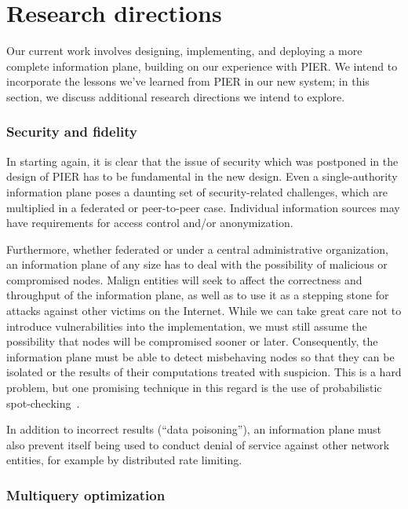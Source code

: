 \documentclass[10pt,twocolumn]{MyTightStyle}
\def\IP{information plane\xspace}
\begin{document}
\section{Research directions}
\label{sec:future}

Our current work involves designing, implementing, and deploying a
more complete \IP, building on our experience with PIER.   We intend
to incorporate the lessons we've learned from PIER in our new system;
in this section, we discuss additional research directions we intend
to explore. 

\subsubsection*{Security and fidelity}

In starting again, it is clear that the issue of security which was
postponed in the design of PIER has to be fundamental in the new
design.
Even a single-authority \IP poses a daunting set
of security-related challenges, which are multiplied in a federated or
peer-to-peer case.  Individual information sources may have
requirements for access control and/or anonymization. 

Furthermore, whether federated or under a central administrative
organization, an \IP of any size has to deal with the possibility of
malicious or compromised nodes.  Malign entities will seek to affect
the correctness and throughput of the \IP, as well as to use it as a
stepping stone for attacks against other victims on the Internet.
While we can take great care not to introduce vulnerabilities into the
implementation, we must still assume the possibility that nodes will
be compromised sooner or later.  Consequently, the \IP must be able to
detect misbehaving nodes so that they can be isolated or the results
of their computations treated with suspicion.  This is a hard problem,
but one promising technique in this regard is the use of probabilistic
spot-checking~\cite{Ergun1998}. 

In addition to incorrect results (``data poisoning''), an \IP must
also prevent itself being used to conduct denial of service against
other network entities, for example by distributed rate limiting.

\subsubsection*{Multiquery optimization}
\end{document}
